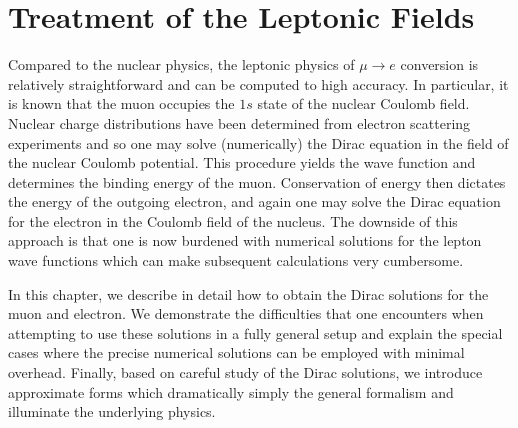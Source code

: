 \documentclass{book}[12pt]
\begin{document}
\chapter{Treatment of the Leptonic Fields}
Compared to the nuclear physics, the leptonic physics of $\mu\rightarrow e$ conversion is relatively straightforward and can be computed to high accuracy. In particular, it is known that the muon occupies the $1s$ state of the nuclear Coulomb field. Nuclear charge distributions have been determined from electron scattering experiments and so one may solve (numerically) the Dirac equation in the field of the nuclear Coulomb potential. This procedure yields the wave function and determines the binding energy of the muon. Conservation of energy then dictates the energy of the outgoing electron, and again one may solve the Dirac equation for the electron in the Coulomb field of the nucleus. The downside of this approach is that one is now burdened with numerical solutions for the lepton wave functions which can make subsequent calculations very cumbersome.

In this chapter, we describe in detail how to obtain the Dirac solutions for the muon and electron. We demonstrate the difficulties that one encounters when attempting to use these solutions in a fully general setup and explain the special cases where the precise numerical solutions can be employed with minimal overhead. Finally, based on careful study of the Dirac solutions, we introduce approximate forms which dramatically simply the general formalism and illuminate the underlying physics. 
\end{document}
